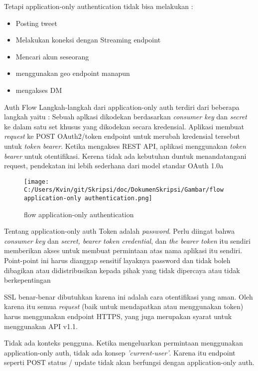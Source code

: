 Tetapi application-only authentication tidak bisa melakukan :

\begin{itemize}
	\item Posting tweet
	\item Melakukan koneksi dengan Streaming endpoint
	\item Mencari akun seseorang
	\item menggunakan geo endpoint manapun
	\item mengakses DM
\end{itemize}

Auth Flow
Langkah-langkah dari application-only auth terdiri dari beberapa langkah yaitu :
Sebuah aplkasi dikodekan berdasarkan \textit{consumer key} dan \textit{secret} ke dalam satu set khusus yang dikodekan secara kredensial.
Aplikasi membuat \textit{request} ke POST OAuth2/token endpoint untuk merubah kredensial tersebut untuk \textit{token bearer}.
Ketika mengakses REST API, aplikasi menggunakan \textit{token bearer} untuk otentifikasi.
Kerena tidak ada kebutuhan duntuk menandatangani request, pendekatan ini lebih sederhana dari model standar OAuth 1.0a

\begin{figure}
	\centering
		\texttt{[image: C:/Users/Kvin/git/Skripsi/doc/DokumenSkripsi/Gambar/flow application-only authentication.png]}
	\caption{flow application-only authentication}
	\label{fig:flow application-only authentication}
\end{figure}


Tentang application-only auth
Token adalah \textit{password}. Perlu diingat bahwa \textit{consumer key} dan \textit{secret, bearer token credential}, dan \textit{the bearer token} itu sendiri memberikan akses untuk membuat permintaan atas nama aplikasi itu sendiri. Point-point ini harus dianggap sensitif layaknya password dan tidak boleh dibagikan atau didistribusikan kepada pihak yang tidak dipercaya atau tidak berkepentingan

SSL benar-benar dibutuhkan karena ini adalah cara otentifikasi yang aman. Oleh karena itu semua \textit{request} (baik untuk mendapatkan atau menggunakan token) harus menggunakan endpoint HTTPS, yang juga merupakan syarat untuk menggunakan API v1.1.

Tidak ada konteks pengguna. Ketika mengeluarkan permintaan menggunakan application-only auth, tidak ada konsep \textit{'current-user'}. Karena itu endpoint seperti POST status / update tidak akan berfungsi dengan application-only auth.

